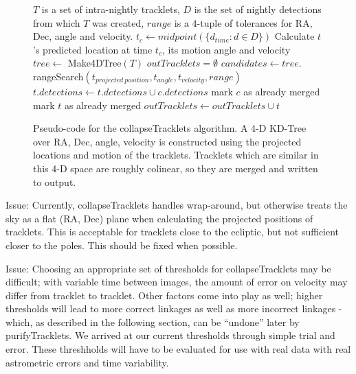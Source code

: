 \begin{figure}[ht]
\hrulefill
\begin{algorithmic}[5]
  \Require $T$ is a set of intra-nightly tracklets, $D$ is the set of nightly detections from which $T$ was created, $range$ is a 4-tuple of tolerances for RA, Dec, angle and velocity.
  \State $t_c \gets midpoint(\{ d_{time} : d \in D \})$
    \State Calculate $t$'s predicted location at time $t_c$, its motion angle and velocity
  \EndFor
  \State {}
  \State $tree \gets$ Make4DTree$(T)$
  \State $outTracklets = \emptyset$
    \State {}
    \State $candidates \gets tree.$rangeSearch$(t_{projected\ position}, t_{angle}, t_{velocity}, range)$
        \State $t.detections \gets t.detections \cup c.detections$
        \State mark $c$ as already merged
      \EndIf
    \EndFor
    \State mark $t$ as already merged
    \State $outTracklets \gets outTracklets \cup t$
  \EndFor
\end{algorithmic}
\hrulefill
\caption[collapseTracklets psuedocode.]{Pseudo-code for the collapseTracklets algorithm. A 4-D KD-Tree over RA, Dec, angle, velocity is constructed using the projected locations and motion of the tracklets.  Tracklets which are similar in this 4-D space are roughly colinear, so they are merged and written to output.}
\label{collapseTrackletsAlgorithm} 
\end{figure}

Issue: Currently, collapseTracklets handles wrap-around, but otherwise treats
the sky as a flat (RA, Dec) plane when calculating the projected
positions of tracklets.  This is acceptable for tracklets close to the
ecliptic, but not sufficient closer to the poles.  This should be
fixed when possible.

Issue: Choosing an appropriate set of thresholds for collapseTracklets may be
difficult; with variable time between images, the amount of error on
velocity may differ from tracklet to tracklet.  Other factors come
into play as well; higher thresholds will lead to more correct
linkages as well as more incorrect linkages - which, as described in
the following section, can be ``undone'' later by purifyTracklets.  We
arrived at our current thresholds through simple trial and
error. These threshholds will have to be evaluated for use with real
data with real astrometric errors and time variability. 


